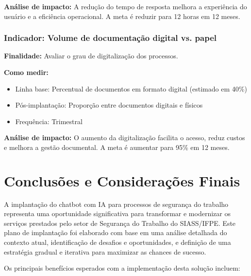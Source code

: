 \documentclass[12pt,a4paper]{article}
\begin{document}
\textbf{Análise de impacto:} A redução do tempo de resposta melhora a experiência do usuário e a eficiência operacional. A meta é reduzir para 12 horas em 12 meses.

\subsubsection{Indicador: Volume de documentação digital vs. papel}

\textbf{Finalidade:} Avaliar o grau de digitalização dos processos.

\textbf{Como medir:} 
\begin{itemize}
    \item Linha base: Percentual de documentos em formato digital (estimado em 40\%)
    \item Pós-implantação: Proporção entre documentos digitais e físicos
    \item Frequência: Trimestral
\end{itemize}

\textbf{Análise de impacto:} O aumento da digitalização facilita o acesso, reduz custos e melhora a gestão documental. A meta é aumentar para 95\% em 12 meses.

\clearpage
\section{Conclusões e Considerações Finais}

A implantação do chatbot com IA para processos de segurança do trabalho representa uma oportunidade significativa para transformar e modernizar os serviços prestados pelo setor de Segurança do Trabalho do SIASS/IFPE. Este plano de implantação foi elaborado com base em uma análise detalhada do contexto atual, identificação de desafios e oportunidades, e definição de uma estratégia gradual e iterativa para maximizar as chances de sucesso.

Os principais benefícios esperados com a implementação desta solução incluem:
\end{document}
